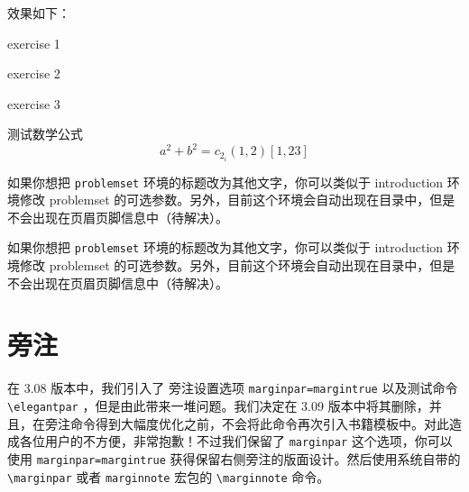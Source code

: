 \documentclass[lang=cn,10pt]{elegantbook}
\begin{document}
效果如下：
\begin{problemset}
  \item exercise 1
  \item exercise 2
  \item exercise 3
  \item 测试数学公式
  \begin{equation}
    a^2+b^2=c_{2_{i}} (1,2) [1,23]
  \end{equation}
\end{problemset}

\begin{remark}
如果你想把 \lstinline{problemset} 环境的标题改为其他文字，你可以类似于 introduction 环境修改 problemset 的可选参数。另外，目前这个环境会自动出现在目录中，但是不会出现在页眉页脚信息中（待解决）。
\end{remark}

\begin{solution}
如果你想把 \lstinline{problemset} 环境的标题改为其他文字，你可以类似于 introduction 环境修改 problemset 的可选参数。另外，目前这个环境会自动出现在目录中，但是不会出现在页眉页脚信息中（待解决）。
\end{solution}



\section{旁注}

在 3.08 版本中，我们引入了 旁注设置选项 \lstinline{marginpar=margintrue} 以及测试命令 \lstinline{\elegantpar} ，但是由此带来一堆问题。我们决定在 3.09 版本中将其删除，并且，在旁注命令得到大幅度优化之前，不会将此命令再次引入书籍模板中。对此造成各位用户的不方便，非常抱歉！不过我们保留了 \lstinline{marginpar} 这个选项，你可以使用 \lstinline{marginpar=margintrue} 获得保留右侧旁注的版面设计。然后使用系统自带的 \lstinline{\marginpar} 或者 \lstinline{marginnote} 宏包的 \lstinline{\marginnote} 命令。
\end{document}
